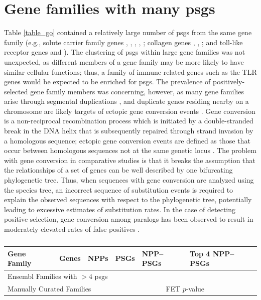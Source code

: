 \section{Gene families with many \acp{psg}}

Table \ref{table_go} contained a relatively large number of \acp{psg}
from the same gene family (e.g., solute carrier family genes
, , , ,
; collagen genes , ,
; and toll-like receptor genes  and
). The clustering of \acp{psg} within large gene families
was not unexpected, as different members of a gene family may be more
likely to have similar cellular functions; thus, a family of
immune-related genes such as the TLR genes would be expected to be
enriched for \acp{psg}. The prevalence of positively-selected gene
family members was concerning, however, as many gene families arise
through segmental duplications \citep{Ohno1970}, and duplicate genes
residing nearby on a chromosome are likely targets of ectopic gene
conversion events \citep{Ezawa2006,Benovoy2009}. Gene conversion is a
non-reciprocal recombination process which is initiated by a
double-stranded break in the DNA helix that is subsequently repaired
through strand invasion by a homologous sequence; ectopic gene
conversion events are defined as those that occur between homologous
sequences not at the same genetic locus \citep{Benovoy2009}. The
problem with gene conversion in comparative studies is that it breaks
the assumption that the relationships of a set of genes can be well
described by one bifurcating phylogenetic tree. Thus, when sequences
with gene conversion are analyzed using the species tree, an incorrect
sequence of substitution events is required to explain the observed
sequences with respect to the phylogenetic tree, potentially leading
to excessive estimates of substitution rates. In the case of detecting
positive selection, gene conversion among paralogs has been observed
to result in moderately elevated rates of false positives
\citep{Casola2009}.

\begin{table}
\centering \footnotesize
\begin{tabular}{lrrrrrl}

\toprule

Gene Family & Genes & NPPs & PSGs &
\multicolumn{2}{l}{NPP--PSGs} & Top 4 NPP--PSGs \\

\midrule
\multicolumn{4}{l}{Ensembl Families with $>4$ \acp{psg}} & & & \\
\midrule



\midrule
\multicolumn{4}{l}{Manually Curated Families} & & \multicolumn{2}{l}{FET $p$-value} \\
\midrule



\bottomrule
\end{tabular}
\caption{}
\label{table_psg_fams}
\end{table}

